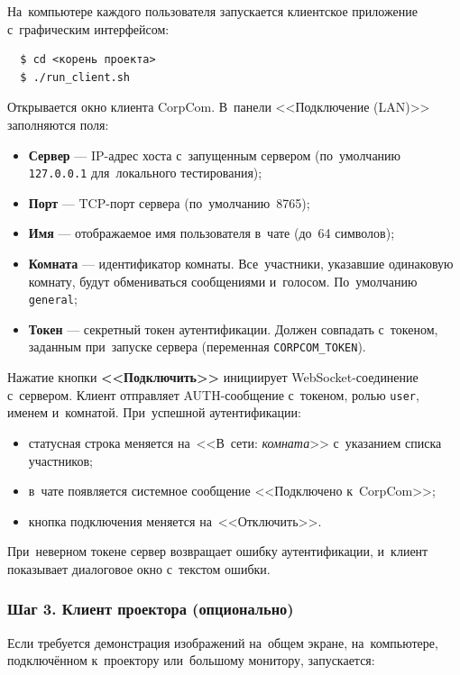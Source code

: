 На~компьютере каждого пользователя запускается клиентское приложение с~графическим интерфейсом:

\begin{verbatim}
  $ cd <корень проекта>
  $ ./run_client.sh
\end{verbatim}

Открывается окно клиента CorpCom. В~панели <<Подключение (LAN)>> заполняются поля:

\begin{itemize}
  \item \textbf{Сервер} --- IP-адрес хоста с~запущенным сервером (по~умолчанию \texttt{127.0.0.1} для~локального тестирования);
  \item \textbf{Порт} --- TCP-порт сервера (по~умолчанию~8765);
  \item \textbf{Имя} --- отображаемое имя пользователя в~чате (до~64 символов);
  \item \textbf{Комната} --- идентификатор комнаты. Все~участники, указавшие одинаковую комнату, будут обмениваться сообщениями и~голосом. По~умолчанию \texttt{general};
  \item \textbf{Токен} --- секретный токен аутентификации. Должен совпадать с~токеном, заданным при~запуске сервера (переменная \texttt{CORPCOM\_TOKEN}).
\end{itemize}

Нажатие кнопки \textbf{<<Подключить>>} инициирует WebSocket-соединение с~сервером. Клиент отправляет AUTH-сообщение с~токеном, ролью \texttt{user}, именем и~комнатой. При~успешной аутентификации:

\begin{itemize}
  \item статусная строка меняется на~<<В~сети: \textit{комната}>> с~указанием списка участников;
  \item в~чате появляется системное сообщение <<Подключено к~CorpCom>>;
  \item кнопка подключения меняется на~<<Отключить>>.
\end{itemize}

При~неверном токене сервер возвращает ошибку аутентификации, и~клиент показывает диалоговое окно с~текстом ошибки.

\subsubsection{Шаг 3. Клиент проектора (опционально)}

Если требуется демонстрация изображений на~общем экране, на~компьютере, подключённом к~проектору или~большому монитору, запускается:

